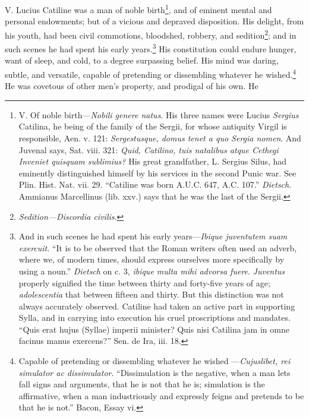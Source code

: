V. Lucius Catiline was a man of noble birth\footnote{V. Of noble birth—\emph{Nobili genere natus}. His three names
were Lucius \emph{Sergius} Catilina, he being of the family of the Sergii,
for whose antiquity Virgil is responsible, Aen. v. 121: \emph{Sergestusque,
domus tenet a quo Sergia nomen}. And Juvenal says, Sat. viii. 321:
\emph{Quid, Catilino, tuis natalibus atque Cethegi Inveniet quisquam
sublimius?} His great grandfather, L. Sergius Silus, had eminently
distinguished himself by his services in the second Punic war. See
Plin. Hist. Nat. vii. 29. ``Catiline was born A.U.C. 647, A.C. 107.''
\emph{Dietsch}. Ammianus Marcellinus (lib. xxv.) says that he was the last
of the Sergii.}, and of eminent mental
and personal endowments; but of a vicious and depraved disposition.
His delight, from his youth, had been civil commotions, bloodshed,
robbery, and sedition\footnote{\emph{Sedition—Discordia civilis}.}; and in such scenes he had spent his early
years.\footnote{And in such scenes he had spent his early years—\emph{Ibique
juventutem suam exercuit}. ``It is to be observed that the Roman
writers often used an adverb, where we, of modern times, should
express ourselves more specifically by using a noun.'' \emph{Dietsch} on c.
3, \emph{ibique multa mihi advorsa fuere}. \emph{Juventus} properly signified
the time between thirty and forty-five years of age; \emph{adolescentia}
that between fifteen and thirty. But this distinction was not always
accurately observed. Catiline had taken an active part in supporting
Sylla, and in carrying into execution his cruel proscriptions and
mandates. ``Quis erat hujus (Syllae) imperii minister? Quis nisi
Catilina jam in omne facinus manus exercens?'' Sen. de Ira, iii. 18.} His constitution could endure hunger, want of sleep, and
cold, to a degree surpassing belief. His mind was daring, subtle, and
versatile, capable of pretending or dissembling whatever he wished.\footnote{Capable of pretending or dissembling whatever he wished
—\emph{Cujuslibet, rei simulator ac dissimulator}. ``Dissimulation is
the negative, when a man lets fall signs and arguments, that he is not
that he is; simulation is the affirmative, when a man industriously
and expressly feigns and pretends to be that he is not.'' Bacon,
Essay vi.}
He was covetous of other men's property, and prodigal of his own. He
